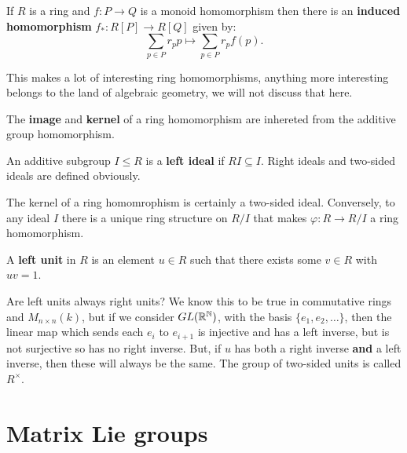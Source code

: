 \documentclass{article}
\begin{document}
\begin{definition}
    If $R$ is a ring and $f:P\rightarrow Q$ is a monoid homomorphism then there is an \textbf{induced homomorphism} $f_* : R[P]\rightarrow R[Q]$ given by: \[
    \sum_{p\in P}r_p p \mapsto \sum_{p\in P} r_pf(p).
    \]
\end{definition}

This makes a lot of interesting ring homomorphisms, anything more interesting belongs to the land of algebraic geometry, we will not discuss that here.

The \textbf{image} and \textbf{kernel} of a ring homomorphism are inhereted from the additive group homomorphism.

\begin{definition}
    An additive subgroup $I\leq R$ is a \textbf{left ideal} if $RI \subseteq I$. Right ideals and two-sided ideals are defined obviously.
\end{definition}

The kernel of a ring homomrophism is certainly a two-sided ideal. Conversely, to any ideal $I$ there is a unique ring structure on $R/I$ that makes $\varphi:R\rightarrow R/I$ a ring homomorphism.

\begin{definition}
    A \textbf{left unit} in $R$ is an element $u\in R$ such that there exists some $v\in R$ with $uv =1$.
\end{definition}

Are left units always right units? We know this to be true in commutative rings and $M_{n\times n}(k)$, but if we consider $GL(\mathbb{R}^{\mathbb{N}})$, with the basis $\{e_1,e_2,\ldots\}$, then the linear map which sends each $e_i$ to $e_{i+1}$ is injective and has a left inverse, but is not surjective so has no right inverse. But, if $u$ has both a right inverse \textbf{and} a left inverse, then these will always be the same. The group of two-sided units is called $R^\times$.

\section{Matrix Lie groups}
\end{document}
